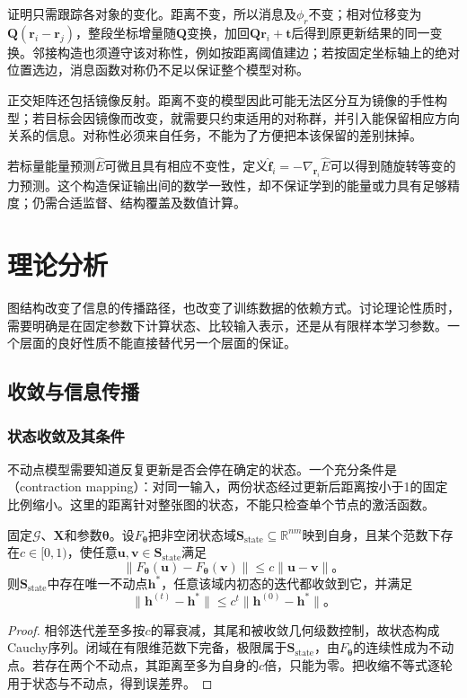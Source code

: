 证明只需跟踪各对象的变化。距离不变，所以消息及$\phi_r$不变；相对位移变为$\bm{Q}(\bm{r}_i-\bm{r}_j)$，整段坐标增量随$\bm{Q}$变换，加回$\bm{Q}\bm{r}_i+\bm{t}$后得到原更新结果的同一变换。邻接构造也须遵守该对称性，例如按距离阈值建边；若按固定坐标轴上的绝对位置选边，消息函数对称仍不足以保证整个模型对称。

正交矩阵还包括镜像反射。距离不变的模型因此可能无法区分互为镜像的手性构型；若目标会因镜像而改变，就需要只约束适用的对称群，并引入能保留相应方向关系的信息。对称性必须来自任务，不能为了方便把本该保留的差别抹掉。

若标量能量预测$\widehat E$可微且具有相应不变性，定义$\widehat{\bm{f}}_i=-\nabla_{\bm{r}_i}\widehat E$可以得到随旋转等变的力预测。这个构造保证输出间的数学一致性，却不保证学到的能量或力具有足够精度；仍需合适监督、结构覆盖及数值计算。

\section{理论分析}
\label{sec:gnn-theory}

图结构改变了信息的传播路径，也改变了训练数据的依赖方式。讨论理论性质时，需要明确是在固定参数下计算状态、比较输入表示，还是从有限样本学习参数。一个层面的良好性质不能直接替代另一个层面的保证。

\subsection{收敛与信息传播}
\label{sec:gnn-propagation-theory}

\subsubsection{状态收敛及其条件}
\label{sec:gnn-state-convergence}

不动点模型需要知道反复更新是否会停在确定的状态。一个充分条件是（contraction mapping）：对同一输入，两份状态经过更新后距离按小于1的固定比例缩小。这里的距离针对整张图的状态，不能只检查单个节点的激活函数。

\begin{theorem}[收缩更新的唯一不动点]
\label{thm:gnn-contraction}
固定$\mathcal{G}$、$\bm{X}$和参数$\bm{\theta}$。设$F_{\bm{\theta}}$把非空闭状态域$\bm{S}_{\mathrm{state}}\subseteq\mathbb{R}^{nm}$映到自身，且某个范数下存在$c\in[0,1)$，使任意$\bm{u},\bm{v}\in\bm{S}_{\mathrm{state}}$满足
\[
  \lVert F_{\bm{\theta}}(\bm{u})-F_{\bm{\theta}}(\bm{v})\rVert
    \leq c\lVert\bm{u}-\bm{v}\rVert\text{。}
\]
则$\bm{S}_{\mathrm{state}}$中存在唯一不动点$\bm{h}^*$，任意该域内初态的迭代都收敛到它，并满足
\begin{equation}
  \lVert\bm{h}^{(t)}-\bm{h}^*\rVert
    \leq c^t\lVert\bm{h}^{(0)}-\bm{h}^*\rVert\text{。}
  \label{eq:gnn-contraction-error}
\end{equation}
\end{theorem}
\begin{proof}
相邻迭代差至多按$c$的幂衰减，其尾和被收敛几何级数控制，故状态构成Cauchy序列。闭域在有限维范数下完备，极限属于$\bm{S}_{\mathrm{state}}$，由$F_{\bm{\theta}}$的连续性成为不动点。若存在两个不动点，其距离至多为自身的$c$倍，只能为零。把收缩不等式逐轮用于状态与不动点，得到误差界。
\end{proof}


